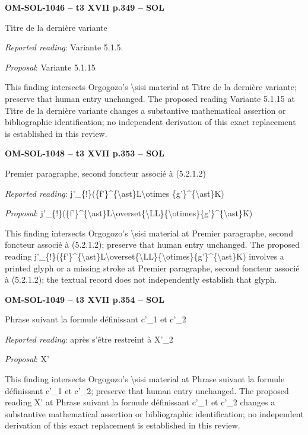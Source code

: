 \par\noindent\textbf{OM-SOL-1046 -- t3 XVII p.349 -- SOL}\par
Titre de la dernière variante\par
\emph{Reported reading}: Variante 5.1.5.\par
\emph{Proposal}: Variante 5.1.15\par
This finding intersects Orgogozo's \textbackslash{}sisi material at Titre de la dernière variante; preserve that human entry unchanged. The proposed reading Variante 5.1.15 at Titre de la dernière variante changes a substantive mathematical assertion or bibliographic identification; no independent derivation of this exact replacement is established in this review.\par
\par\noindent\textbf{OM-SOL-1048 -- t3 XVII p.353 -- SOL}\par
Premier paragraphe, second foncteur associé à (5.2.1.2)\par
\emph{Reported reading}: j'\_\{!\}(\{f'\}\textasciicircum{}\{\textbackslash{}ast\}L\textbackslash{}otimes \{g'\}\textasciicircum{}\{\textbackslash{}ast\}K)\par
\emph{Proposal}: j'\_\{!\}(\{f'\}\textasciicircum{}\{\textbackslash{}ast\}L\textbackslash{}overset\{\textbackslash{}LL\}\{\textbackslash{}otimes\}\{g'\}\textasciicircum{}\{\textbackslash{}ast\}K)\par
This finding intersects Orgogozo's \textbackslash{}sisi material at Premier paragraphe, second foncteur associé à (5.2.1.2); preserve that human entry unchanged. The proposed reading j'\_\{!\}(\{f'\}\textasciicircum{}\{\textbackslash{}ast\}L\textbackslash{}overset\{\textbackslash{}LL\}\{\textbackslash{}otimes\}\{g'\}\textasciicircum{}\{\textbackslash{}ast\}K) involves a printed glyph or a missing stroke at Premier paragraphe, second foncteur associé à (5.2.1.2); the textual record does not independently establish that glyph.\par
\par\noindent\textbf{OM-SOL-1049 -- t3 XVII p.354 -- SOL}\par
Phrase suivant la formule définissant c'\_1 et c'\_2\par
\emph{Reported reading}: après s'être restreint à X'\_2\par
\emph{Proposal}: X'\par
This finding intersects Orgogozo's \textbackslash{}sisi material at Phrase suivant la formule définissant c'\_1 et c'\_2; preserve that human entry unchanged. The proposed reading X' at Phrase suivant la formule définissant c'\_1 et c'\_2 changes a substantive mathematical assertion or bibliographic identification; no independent derivation of this exact replacement is established in this review.\par
